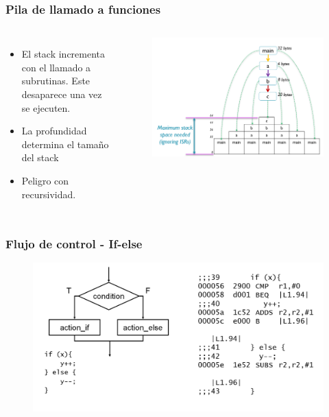 \documentclass[10.5pt,scale=1.0,t,aspectratio=169,hyperref={pdfpagelabels=false}]{beamer}
\begin{document}
\begin{frame}
	\frametitle{Pila de llamado a funciones}
	\begin{columns}
		\begin{itemize}
			\item El stack incrementa con el llamado a subrutinas. Este desaparece una vez se ejecuten.
			\item La profundidad determina el tamaño del stack
			\item Peligro con recursividad. 
		\end{itemize}
		\begin{figure}
			\centering
			\includegraphics[scale=0.35]{MaxStack}
		\end{figure}
	\end{columns}
\end{frame}

\begin{frame}
	\frametitle{Flujo de control - If-else}
	\begin{figure}
		\centering
		\includegraphics[scale=0.4]{IfElseAssembly}
	\end{figure}
\end{frame}
\end{document}
